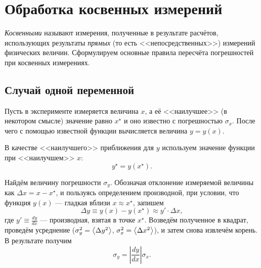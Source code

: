 \section{Обработка косвенных измерений\label{sec:kosv}}

\emph{Косвенными} называют измерения, полученные в результате расчётов,
использующих результаты \emph{прямых} (то есть <<непосредственных>>)
измерений физических величин. Сформулируем основные правила пересчёта
погрешностей при косвенных измерениях.

\subsection{Случай одной переменной}

Пусть в эксперименте измеряется величина $x$, а её <<наилучшее>>
(в некотором смысле) значение равно $x^{\star}$ и оно известно с
погрешностью $\sigma_{x}$. После чего с помощью известной функции
вычисляется величина $y=y\!\left(x\right)$.

В качестве <<наилучшего>> приближения для
$y$ используем значение функции при <<наилучшем>>
$x$:
\[
y^{\star}=y\!\left(x^{\star}\right).
\]

Найдём величину погрешности $\sigma_{y}$. Обозначая отклонение измеряемой
величины как $\Delta x=x-x^{\star}$, и пользуясь определением производной,
при условии, что функция $y\left(x\right)$ --- гладкая
вблизи $x\approx x^{\star}$, запишем 
\[
\Delta y\equiv y\left(x\right)-y\left(x^{\star}\right)\approx y'\cdot\Delta x,
\]
где $y'\equiv\frac{dy}{dx}$ --- производная, взятая в точке
$x^{\star}$. Возведём полученное в квадрат, проведём усреднение ($\sigma_{y}^{2}=\left<\Delta y^{2}\right>$,
$\sigma_{x}^{2}=\left<\Delta x^{2}\right>$), и затем снова извлечём
корень. В результате получим
\begin{equation}
\boxed{{\sigma_{y}=\left|\frac{dy}{dx}\right|\sigma_{x}.}}\label{eq:sxy}
\end{equation}



